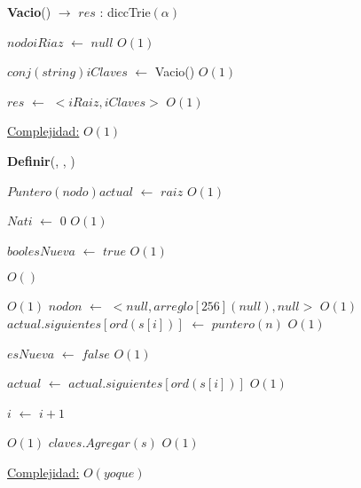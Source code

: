 \begin{Algoritmos}
  
  
\begin{algorithm}[H]
{\textbf{Vacio}() $\to$ $res$ : diccTrie$(\alpha)$}
\begin{algorithmic}[1]

\State $nodo iRiaz$ $\gets $ $null$  \Comment $O(1)$
 
\State $conj(string) iClaves$ $\gets$ Vacio() \Comment $O(1)$

\State $res$ $\gets$ $<iRaiz, iClaves>$ \Comment $O(1)$

\medskip
\State \underline{Complejidad:} $O(1)$

\end{algorithmic}
\end{algorithm}
  


\begin{algorithm}[H]
{\textbf{Definir}(, , )}
\begin{algorithmic}[1]

\State $Puntero(nodo) actual$ $\gets$ $raiz$ \Comment $O(1)$

\State $Nat i$ $\gets$ $0$ \Comment $O(1)$

\State $bool esNueva$ $\gets$ $true$ \Comment $O(1)$

   \Comment $O()$
	
	
	
	 \Comment $O(1)$
		\State $nodo n$ $\gets$ $<null, arreglo[256](null), null>$ \Comment $O(1)$
		\State $actual.siguientes[ord(s[i])]$ $\gets$		 $puntero(n)$ \Comment $O(1)$
		
		\State $esNueva$ $\gets$ $false$ \Comment $O(1)$	 
	
	\EndIf
	
	\State $actual$ $\gets$ $actual.siguientes[ord(s[i])]$ \Comment $O(1)$

	\State $i$ $\gets$ $i + 1$
\EndWhile 

 \Comment $O(1)$
	\State $claves.Agregar(s)$ \Comment $O(1)$
\EndIf

\medskip
\State \underline{Complejidad:} $O(yoque)$

\end{algorithmic}
\end{algorithm}  
  
  
\end{Algoritmos}

